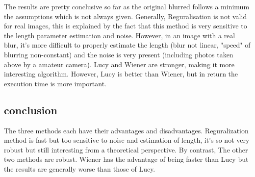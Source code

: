  
The results are pretty conclusive so far as the original blurred follows a minimum the assumptions which is not always given. Generally, Reguralisation is not valid for real images, this is explained by the fact that this method is very sensitive to the length parameter estimation and noise. However, in an image with a real blur, it's more difficult to properly estimate the length (blur not linear, "speed" of blurring non-constant) and the noise is very present (including photos taken above by a amateur camera). Lucy and Wiener are stronger, making it more interesting algorithm. However, Lucy is better than Wiener, but in return the execution time is more important.

\subsection{conclusion}

The three methods each have their advantages and disadvantages. Reguralization method is fast but too sensitive to noise and estimation of length, it's so not very robust but still interesting from a theoretical perspective. By contrast, The other two methods are robust. Wiener has the advantage of being faster than Lucy but the results are generally worse than those of Lucy.

